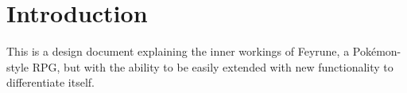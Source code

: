 \section{Introduction}
\begin{comment}
	Give an introduction to the document and your application.
\end{comment}
This is a design document explaining the inner workings of Feyrune, a Pokémon-style RPG, but with the ability to be easily extended with new functionality to differentiate itself.


